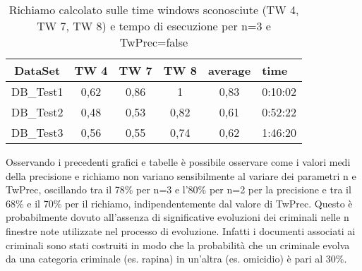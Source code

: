 \begin{table}[H]
	\centering
	\footnotesize
	\begin{tabular}{|cccccp{}|}
	\hline
	\textbf{DataSet} & \textbf{TW 4} & \textbf{ TW 7} & \textbf{TW 8} & \textbf{average} & \textbf{time}\\
	\hline 
	DB\_Test1 & 0,62 & 0,86 & 1 & 0,83 & 0:10:02\\ 
	DB\_Test2 & 0,48 & 0,53 & 0,82 & 0,61 & 0:52:22\\ 
	DB\_Test3 & 0,56 & 0,55 & 0,74 & 0,62 & 1:46:20\\ 
	\hline 
	\end{tabular}
	\caption{Richiamo calcolato  sulle time windows sconosciute (TW 4, TW 7, TW 8) e tempo di esecuzione per n=3 e TwPrec=false}
\end{table}



Osservando i precedenti grafici e tabelle è possibile osservare come i valori medi della precisione e richiamo non variano sensibilmente al variare dei parametri n e TwPrec, oscillando tra il 78\% per n=3 e l'80\% per n=2 per la precisione e tra il 68\% e il 70\% per il richiamo, indipendentemente dal valore di TwPrec. Questo è probabilmente dovuto all'assenza di significative evoluzioni dei criminali nelle n finestre note utilizzate nel processo di evoluzione. Infatti i documenti associati ai criminali sono stati costruiti in modo che la probabilità che un criminale evolva da una categoria criminale (es. rapina) in un'altra (es. omicidio) è pari al 30\%. 


